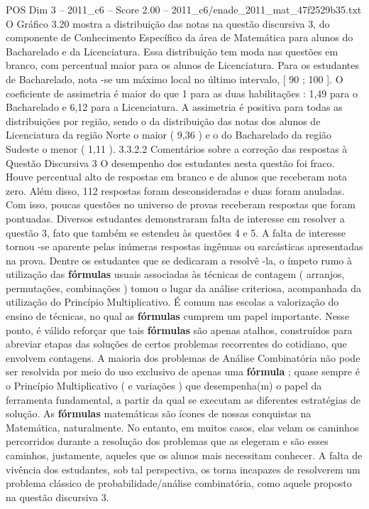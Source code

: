 \begin{textsample}{POS Dim 3 – 2011\_c6 – Score 2.00 – 2011\_c6/enade\_2011\_mat\_47f2529b35.txt}
O Gráfico 3.20 mostra a distribuição das notas na questão discursiva 3, do componente de Conhecimento Específico da área de Matemática para alunos do Bacharelado e da Licenciatura.
Essa distribuição tem moda nas questões em branco, com percentual maior para os alunos de Licenciatura.
Para os estudantes de Bacharelado, nota -se um máximo local no último intervalo, [ 90 ; 100 ].
O coeficiente de assimetria é maior do que 1 para as duas habilitações : 1,49 para o Bacharelado e 6,12 para a Licenciatura.
A assimetria é positiva para todas as distribuições por região, sendo o da distribuição das notas dos alunos de Licenciatura da região Norte o maior ( 9,36 ) e o do Bacharelado da região Sudeste o menor ( 1,11 ). 3.3.2.2 Comentários sobre a correção das respostas à Questão Discursiva 3 O desempenho dos estudantes nesta questão foi fraco.
Houve percentual alto de respostas em branco e de alunos que receberam nota zero.
Além disso, 112 respostas foram desconsideradas e duas foram anuladas.
Com isso, poucas questões no universo de provas receberam respostas que foram pontuadas.
Diversos estudantes demonstraram falta de interesse em resolver a questão 3, fato que também se estendeu às questões 4 e 5.
A falta de interesse tornou -se aparente pelas inúmeras respostas ingênuas ou sarcásticas apresentadas na prova.
Dentre os estudantes que se dedicaram a resolvê -la, o ímpeto rumo à utilização das \textbf{fórmulas} usuais associadas às técnicas de contagem ( arranjos, permutações, combinações ) tomou o lugar da análise criteriosa, acompanhada da utilização do Princípio Multiplicativo.
É comum nas escolas a valorização do ensino de técnicas, no qual as \textbf{fórmulas} cumprem um papel importante.
Nesse ponto, é válido reforçar que tais \textbf{fórmulas} são apenas atalhos, construídos para abreviar etapas das soluções de certos problemas recorrentes do cotidiano, que envolvem contagens.
A maioria dos problemas de Análise Combinatória não pode ser resolvida por meio do uso exclusivo de apenas uma \textbf{fórmula} ; quase sempre é o Princípio Multiplicativo ( e variações ) que desempenha(m) o papel da ferramenta fundamental, a partir da qual se executam as diferentes estratégias de solução.
As \textbf{fórmulas} matemáticas são ícones de nossas conquistas na Matemática, naturalmente.
No entanto, em muitos casos, elas velam os caminhos percorridos durante a resolução dos problemas que as elegeram e são esses caminhos, justamente, aqueles que os alunos mais necessitam conhecer.
A falta de vivência dos estudantes, sob tal perspectiva, os torna incapazes de resolverem um problema clássico de probabilidade/análise combinatória, como aquele proposto na questão discursiva 3.

\end{textsample}
